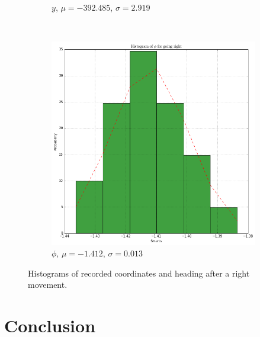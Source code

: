 \documentclass[paper=a4, fontsize=11pt]{scrartcl} %
\begin{document}
\begin{figure}[h!]
\begin{subfigure}[b]{0.3\textwidth}
        \caption{$y$, $\mu = -392.485$, $\sigma = 2.919$}
    \end{subfigure}
    ~
    \begin{subfigure}[b]{0.3\textwidth}
        \setlength{\fboxsep}{0.5pt} %
        \setlength{\fboxrule}{0.5pt}
        \includegraphics[width=\textwidth,fbox]{images/histogram_5_phi_right.png}
        \caption{$\phi$, $\mu = -1.412$, $\sigma = 0.013$}
    \end{subfigure}
    \caption{Histograms of recorded coordinates and heading after a right movement.}
\end{figure}

\newpage
\section{Conclusion}
\end{document}
